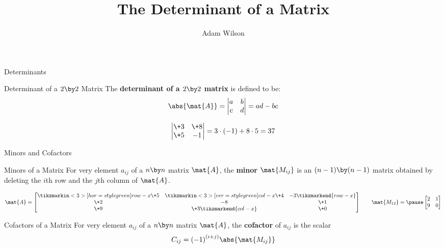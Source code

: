 \documentclass{beamer}
\title[MATH 2250 - Section 3.4]{The Determinant of a Matrix}
\author{Adam Wilson}
\institute{Salt Lake Community College}
\date{}
\begin{document}
\begin{frame}
  \titlepage
\end{frame}

\begin{frame}{Determinants}
\begin{block}{Determinant of a $2 \by 2$ Matrix}
The \textbf{determinant of a $2 \by 2$ matrix} is defined to be:
\begin{equation*}
\abs{\mat{A}} = 
\begin{vmatrix}
a & b \\
c & d
\end{vmatrix}
=ad-bc
\end{equation*}
\end{block}\pause
\begin{example}
\begin{equation*}
\begin{vmatrix}
\+3 & \+8\\
\+5 & -1
\end{vmatrix}
=3\cdot (-1) + 8\cdot 5=37
\end{equation*}
\end{example}
\end{frame}

\begin{frame}{Minors and Cofactors}
\begin{block}{Minors of a Matrix}
For very element $a_{ij}$ of a $n \by n$ matrix $\mat{A}$, the \textbf{minor} $\mat{M_{ij}}$ is an $(n-1) \by (n-1)$ matrix obtained by deleting the $i$th row and the $j$th column of $\mat{A}$.
\end{block}\pause
\begin{example}
\begin{equation*}
\mat{A}=
\begin{bmatrix}
	\tikzmarkin<3>[hor=style green]{row-x}\+5 & \tikzmarkin<3>[ver=style green]{col-x}\+4 &  -3\tikzmarkend{row-x}\\
	\+2 &  -8 & \+1\\
	\+9 & \+3\tikzmarkend{col-x} & \+0\\
\end{bmatrix}
\qquad
\mat{M_{12}}=\pause
\begin{bmatrix}
		2 & 1\\
		9 & 0\\
\end{bmatrix}
\end{equation*}
\end{example}\pause
\begin{block}{Cofactors of a Matrix}
For very element $a_{ij}$ of a $n \by n$ matrix $\mat{A}$, the \textbf{cofactor} of $a_{ij}$ is the scalar
\begin{equation*}
C_{ij}={(-1)}^{(i+j)}\abs{\mat{M_{ij}}}
\end{equation*}
\end{block}
\end{frame}
\end{document}
